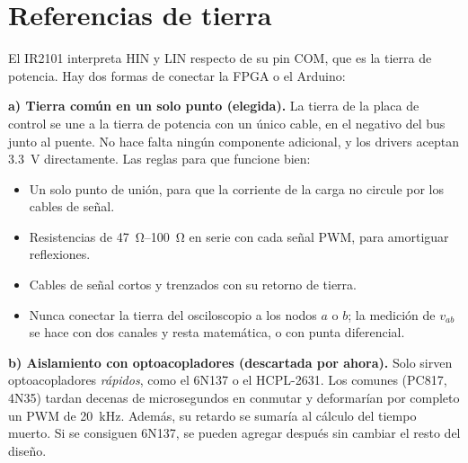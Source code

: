 \documentclass[10pt,twocolumn,letterpaper]{article}
\begin{document}
\section{Referencias de tierra}\label{sec:tierra}
El IR2101 interpreta HIN y LIN respecto de su pin COM, que es la tierra de potencia. Hay dos formas de conectar la FPGA o el Arduino:

\textbf{a) Tierra común en un solo punto (elegida).} La tierra de la placa de control se une a la tierra de potencia con un único cable, en el negativo del bus junto al puente. No hace falta ningún componente adicional, y los drivers aceptan \SI{3,3}{\volt} directamente. Las reglas para que funcione bien:
\begin{itemize}[leftmargin=*]
\item Un solo punto de unión, para que la corriente de la carga no circule por los cables de señal.
\item Resistencias de \SIrange{47}{100}{\ohm} en serie con cada señal PWM, para amortiguar reflexiones.
\item Cables de señal cortos y trenzados con su retorno de tierra.
\item Nunca conectar la tierra del osciloscopio a los nodos $a$ o $b$; la medición de $v_{ab}$ se hace con dos canales y resta matemática, o con punta diferencial.
\end{itemize}

\textbf{b) Aislamiento con optoacopladores (descartada por ahora).} Solo sirven optoacopladores \emph{rápidos}, como el 6N137 o el HCPL-2631. Los comunes (PC817, 4N35) tardan decenas de microsegundos en conmutar y deformarían por completo un PWM de \SI{20}{\kilo\hertz}. Además, su retardo se sumaría al cálculo del tiempo muerto. Si se consiguen 6N137, se pueden agregar después sin cambiar el resto del diseño.

\end{document}
